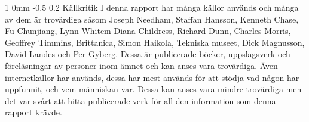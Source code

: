 \documentclass[a4paper,12pt]{article}
\makeatletter
\renewcommand{\section}{\@startsection
   {section}%
   {1}%
   {0mm}%
   {-0.5\baselineskip}%
   {0.2\baselineskip}%
   {\sffamily\bfseries\upshape\normalsize}}%
\makeatother
\begin{document}
\section{Källkritik}
I denna rapport har många källor används och många av dem är trovärdiga såsom Joseph Needham, Staffan Hansson, Kenneth Chase, Fu Chunjiang, Lynn Whitem Diana Childress, Richard Dunn, Charles Morris, Geoffrey Timmins, Brittanica, Simon Haikola, Tekniska museet, Dick Magnusson, David Landes och Per Gyberg. Dessa är publicerade böcker, uppslagsverk och föreläsningar av personer inom ämnet och kan anses vara trovärdiga. Även internetkällor har används, dessa har mest används för att stödja vad någon har uppfunnit, och vem människan var. Dessa kan anses vara mindre trovärdiga men det var svårt att hitta publicerade verk för all den information som denna rapport krävde. 
\newpage



\end{document}
